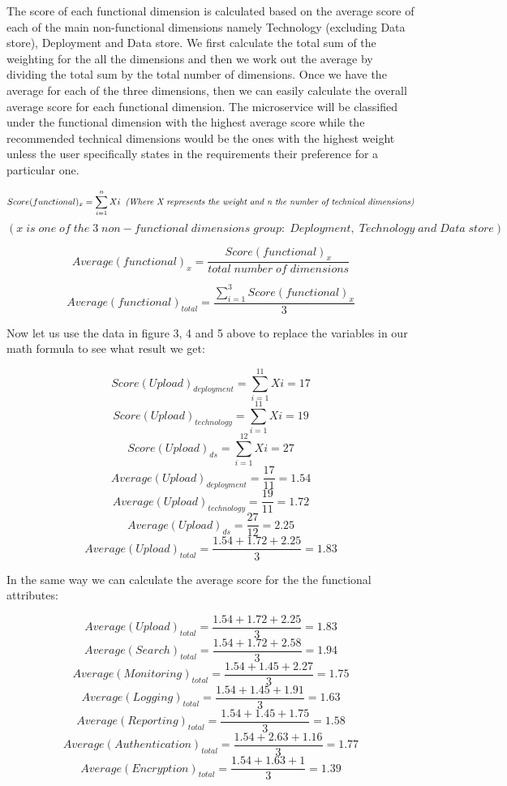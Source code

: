 \documentclass{article}
\begin{document}
The score of each functional dimension is calculated based on the average score of each of the main non-functional dimensions namely Technology (excluding Data store), Deployment and Data store. We first calculate the total sum of the weighting for the all the dimensions and then we work out the average by dividing the total sum by the total number of dimensions. Once we have the average for each of the three dimensions, then we can easily calculate the overall average score for each functional dimension. The microservice will be classified under the functional dimension with the highest average score while the recommended technical dimensions would be the ones with the highest weight unless the user specifically states in the requirements their preference for a particular one.

\[Score(functional)_{x}=\sum_{i=1}^{n}Xi \; \; \text{\textit{(Where X represents the weight and n the number of technical dimensions)}}\] 
\[(x \;is\; one\; of\; the \;3 \;non-functional \;dimensions\; group: \;Deployment,\; Technology \;and \;Data\; store) \]

\[Average(functional)_{x}=\frac{Score(functional)_{x}}{total \; number \; of \; dimensions} \]

\[Average(functional)_{total}=\frac{\sum_{i=1}^{3}Score(functional)_{x}}{3} \]

Now let us use the data in figure 3, 4 and 5 above to replace the variables in our math formula to see what result we get:

\[Score(Upload)_{deployment}=\sum_{i=1}^{11}Xi = 17\] 
\[Score(Upload)_{technology}=\sum_{i=1}^{11}Xi = 19\] 
\[Score(Upload)_{ds}=\sum_{i=1}^{12}Xi = 27\] 
\[Average(Upload)_{deployment}=\frac{17}{11} = 1.54 \]
\[Average(Upload)_{technology}=\frac{19}{11} = 1.72 \]
\[Average(Upload)_{ds}=\frac{27}{12} = 2.25 \]
\[Average(Upload)_{total}=\frac{1.54 + 1.72 + 2.25}{3} = 1.83\]

In the same way we can calculate the average score for the the functional attributes:

\[Average(Upload)_{total}=\frac{1.54 + 1.72 + 2.25}{3} = 1.83\]
\[Average(Search)_{total}=\frac{1.54 + 1.72 + 2.58}{3} = 1.94\]
\[Average(Monitoring)_{total}=\frac{1.54 + 1.45 + 2.27}{3} = 1.75\]
\[Average(Logging)_{total}=\frac{1.54 + 1.45 + 1.91}{3} = 1.63\]
\[Average(Reporting)_{total}=\frac{1.54 + 1.45 + 1.75}{3} = 1.58\]
\[Average(Authentication)_{total}=\frac{1.54 + 2.63 + 1.16}{3} = 1.77\]
\[Average(Encryption)_{total}=\frac{1.54 + 1.63 + 1}{3} = 1.39\]
\end{document}
